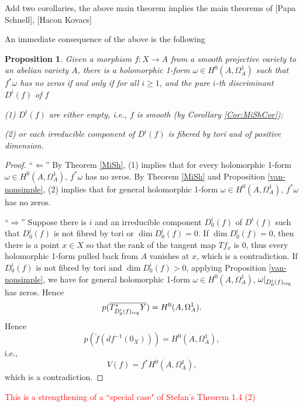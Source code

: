 \documentclass[a4paper,12pt,reqno]{amsart}
\theoremstyle{plain}
\newtheorem{proposition}[theorem]{Proposition}
\theoremstyle{remark}
\newcommand{\sorry}[1]{\textcolor{red}{#1}}
\begin{document}
{\color{red} Add two corollaries, the above main theorem implies the main theorems of [Papa Schnell], [Hacon Kovacs]}

An immediate consequence of the above is the
following

\begin{proposition}
Given a morphism $f\colon X\to A$ from a smooth 
projective variety to an abelian variety $A$, there is a holomorphic 1-form $\omega\in H^0(A, \Omega_A^1)$ such that $f^*\omega$ has no zeros if and only
if for all $i\geq1$, and the pure $i$-th discriminant $D^i(f)$ of $f$

(1) $D^i(f)$ are either empty, i.e., $f$ is smooth (by Corollary \ref{Cor:MiShCor});

(2) or each irreducible component of $D^i(f)$ is fibered by tori and of positive dimension. 
\label{thm:nonvanishing}
\end{proposition}

\begin{proof} ``$\Leftarrow$'' By Theorem \ref{MiSh}, (1) implies that for every holomorphic 1-form $\omega\in H^0(A, \Omega_A^1)$, $f^*\omega$ has no zeros. By Theorem \ref{MiSh} and Proposition \ref{van-nonsimple}, (2) implies that for general holomorphic 1-form $\omega\in H^0(A, \Omega_A^1)$, $f^*\omega$ has no zeros.


``$\Rightarrow$'' 
Suppose there is $i$ and an irreducible component $D_0^i(f)$ of $D^i(f)$ such that $D_0^i(f)$ is not fibred by tori or $\dim D_0^i(f)=0$. If $\dim D^i_0(f)=0$, then there is a point $x\in X$ so that the rank of the tangent map $Tf_x$ is 0, thus every holomorphic 1-form pulled back from $A$ vanishes at $x$, which is a contradiction. If $D_0^i(f)$ is not fibred by tori and $\dim D_0^i(f)>0$, applying Proposition \ref{van-nonsimple}, we have for general holomorphic 1-form $\omega\in H^0(A, \Omega_A^1)$, $\omega|_{D_0^i(f)_{\textnormal{reg}}}$ has zeros. Hence $$p(\overline{T^*_{D_0^i(f)_{\textnormal{reg}}}Y})=H^0(A, \Omega_A^1).$$ Hence $$p(\tilde{f}(df^{-1}(0_X)))=H^0(A, \Omega_A^1),$$ i.e.,$$V(f)=f^*H^0(A, \Omega_A^1),$$ which is a contradiction.
\end{proof}

\sorry{This is a strengthening of a ``special case" of Stefan's Theorem 1.4 (2)}


\end{document}
